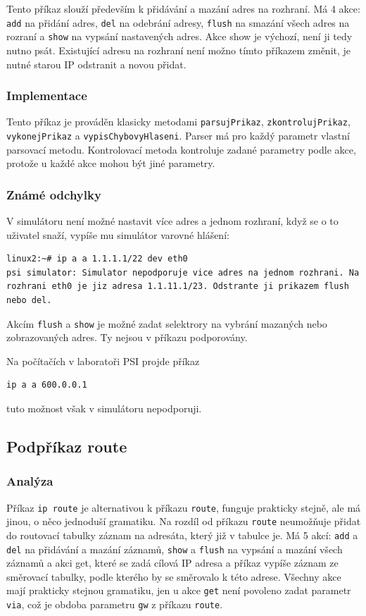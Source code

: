 Tento příkaz slouží především k přidávání a mazání adres na rozhraní. Má 4 akce: \verb|add| na přidání adres, \verb|del| na odebrání adresy, \verb|flush| na smazání všech adres na rozraní a \verb|show| na vypsání nastavených adres. Akce show je výchozí, není ji tedy nutno psát. Existující adresu na rozhraní není možno tímto příkazem změnit, je nutné starou IP odstranit a novou přidat. 

\subsubsection{Implementace}

Tento příkaz je prováděn klasicky metodami \verb|parsujPrikaz|, \verb|zkontrolujPrikaz|, \verb|vykonejPrikaz| a \verb|vypisChybovyHlaseni|. Parser má pro každý parametr vlastní parsovací metodu. Kontrolovací metoda kontroluje zadané parametry podle akce, protože u každé akce mohou být jiné parametry.

\subsubsection{Známé odchylky}

V simulátoru není možné nastavit více adres a jednom rozhraní, když se o to uživatel snaží, vypíše mu simulátor varovné hlášení:
\begin{verbatim}
linux2:~# ip a a 1.1.1.1/22 dev eth0
psi simulator: Simulator nepodporuje vice adres na jednom rozhrani. Na rozhrani eth0 je jiz adresa 1.1.11.1/23. Odstrante ji prikazem flush nebo del.
\end{verbatim}

Akcím \verb|flush| a \verb|show| je možné zadat selektrory na vybrání mazaných nebo zobrazovaných adres. Ty nejsou v příkazu podporovány.

Na počítačích v laboratoři PSI projde příkaz
\begin{verbatim}
ip a a 600.0.0.1
\end{verbatim}
tuto možnost však v simulátoru nepodporuji.


\subsection{Podpříkaz route}

\subsubsection{Analýza}

Příkaz \verb|ip route| je alternativou k příkazu \verb|route|, funguje prakticky stejně, ale má jinou, o něco jednoduší gramatiku. Na rozdíl od příkazu \verb|route| neumožňuje přidat do routovací tabulky záznam na adresáta, který již v tabulce je. Má 5 akcí: \verb|add| a \verb|del| na přidávání a mazání záznamů, \verb|show| a \verb|flush| na vypsání a mazání všech záznamů a akci get, které se zadá cílová IP adresa a příkaz vypíše záznam ze směrovací tabulky, podle kterého by se směrovalo k této adrese. Všechny akce mají prakticky stejnou gramatiku, jen u akce \verb|get| není povoleno zadat parametr \verb|via|, což je obdoba parametru \verb|gw| z příkazu \verb|route|.

